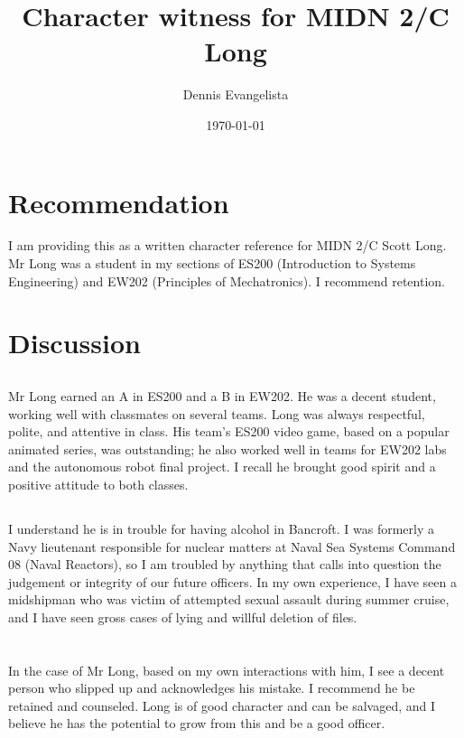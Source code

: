 \documentclass[12pt,courier]{navymemo}
\author{Dennis Evangelista}
\title{Character witness for MIDN 2/C Long}
\date{\today}
\begin{document}
\makedateblock{}

\MEMORANDUM{}

\begin{navyletterheader}
\navysubjline{}%
\end{navyletterheader}

\section{Recommendation} I am providing this as a written character reference for MIDN 2/C Scott Long. Mr Long was a student in my sections of ES200 (Introduction to Systems Engineering) and EW202 (Principles of Mechatronics). I recommend retention.  

\section{Discussion} 
\subsection{} Mr Long earned an A in ES200 and a B in EW202. He was a decent student, working well with classmates on several teams. Long was always respectful, polite, and attentive in class. His team's ES200 video game, based on a popular animated series, was outstanding; he also worked well in teams for EW202 labs and the autonomous robot final project. I recall he brought good spirit and a positive attitude to both classes. 

\subsection{} I understand he is in trouble for having alcohol in Bancroft. I was formerly a Navy lieutenant responsible for nuclear matters at Naval Sea Systems Command 08 (Naval Reactors), so I am troubled by anything that calls into question the judgement or integrity of our future officers. In my own experience, I have seen a midshipman who was victim of attempted sexual assault during summer cruise, and I have seen gross cases of lying and willful deletion of files. 

\section{} In the case of Mr Long, based on my own interactions with him, I see a decent person who slipped up and acknowledges his mistake. I recommend he be retained and counseled. Long is of good character and can be salvaged, and I believe he has the potential to grow from this and be a good officer. 
\end{document}
